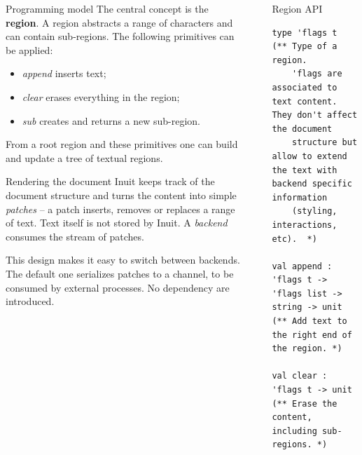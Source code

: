 \documentclass[final]{beamer}
\newlength{\sepwid}
\newlength{\onecolwid}
\newlength{\twocolwid}
\begin{document}
\begin{frame}[containsverbatim,t]
\begin{columns}[t]
\begin{column}{\onecolwid}
\begin{alertblock}{Programming model}
  The central concept is the \textbf{region}. A region abstracts a range of
  characters and can contain sub-regions.  The following primitives can be
  applied:

  \begin{itemize}
    \item {\em append} inserts text;
    \item {\em clear} erases everything in the region;
    \item {\em sub} creates and returns a new sub-region.
  \end{itemize}

  From a root region and these primitives one can build and
  update a tree of textual regions.
\end{alertblock}

\begin{block}{Rendering the document}
Inuit keeps track of the document structure and turns the content into simple
{\em patches} -- a patch inserts, removes or replaces a range of text. Text
itself is not stored by Inuit.
A {\em backend} consumes the stream of patches.

This design makes it easy to switch between backends.  The default one
serializes patches to a channel, to be consumed by external processes.  No
dependency are introduced.
\end{block}

\end{column} %

\begin{column}{\sepwid}\end{column} %

\begin{column}{\twocolwid} %


\begin{alertblock}{Region API}

\begin{lstlisting}
type 'flags t
(** Type of a region.
    'flags are associated to text content. They don't affect the document
    structure but allow to extend the text with backend specific information
    (styling, interactions, etc).  *)

val append : 'flags t -> 'flags list -> string -> unit
(** Add text to the right end of the region. *)

val clear : 'flags t -> unit
(** Erase the content, including sub-regions. *)


\end{lstlisting}
\end{alertblock}
\end{column}
\end{columns}
\end{frame}
\end{document}
